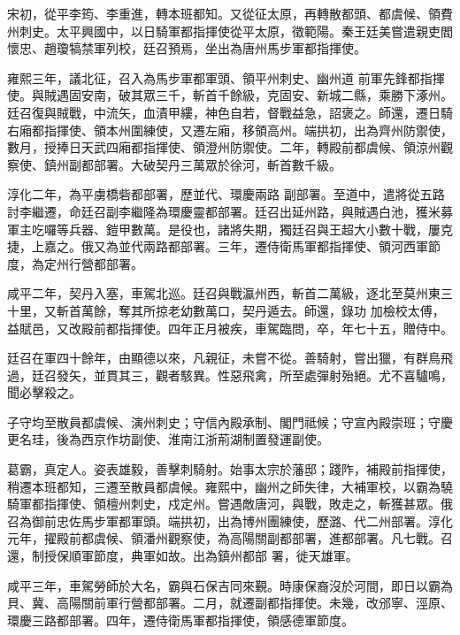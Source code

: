 \begin{pinyinscope}
 宋初，從平李筠、李重進，轉本班都知。又從征太原，再轉散都頭、都虞候、領費州刺史。太平興國中，以日騎軍都指揮使從平太原，徵範陽。秦王廷美嘗遣親吏閻懷忠、趙瓊犒禁軍列校，廷召預焉，坐出為唐州馬步軍都指揮使。



 雍熙三年，議北征，召入為馬步軍都軍頭、領平州刺史、幽州道
 前軍先鋒都指揮使。與賊遇固安南，破其眾三千，斬首千餘級，克固安、新城二縣，乘勝下涿州。廷召復與賊戰，中流矢，血漬甲縷，神色自若，督戰益急，詔褒之。師還，遷日騎右廂都指揮使、領本州圍練使，又遷左廂，移領高州。端拱初，出為齊州防禦使，數月，授捧日天武四廂都指揮使、領澄州防禦使。二年，轉殿前都虞候、領涼州觀察使、鎮州副都部署。大破契丹三萬眾於徐河，斬首數千級。



 淳化二年，為平虜橋砦都部署，歷並代、環慶兩路
 副部署。至道中，遣將從五路討李繼遷，命廷召副李繼隆為環慶靈都部署。廷召出延州路，與賊遇白池，獲米募軍主吃囉等兵器、鎧甲數萬。是役也，諸將失期，獨廷召與王超大小數十戰，屢克捷，上嘉之。俄又為並代兩路都部署。三年，遷侍衛馬軍都指揮使、領河西軍節度，為定州行營都部署。



 咸平二年，契丹入塞，車駕北巡。廷召與戰瀛州西，斬首二萬級，逐北至莫州東三十里，又斬首萬餘，奪其所掠老幼數萬口，契丹遁去。師還，錄功
 加檢校太傅，益賦邑，又改殿前都指揮使。四年正月被疾，車駕臨問，卒，年七十五，贈侍中。



 廷召在軍四十餘年，由顯德以來，凡親征，未嘗不從。善騎射，嘗出獵，有群鳥飛過，廷召發矢，並貫其三，觀者駭異。性惡飛禽，所至處彈射殆絕。尤不喜驢鳴，聞必擊殺之。



 子守均至散員都虞候、演州刺史；守信內殿承制、閣門祗候；守宣內殿崇班；守慶更名珪，後為西京作坊副使、淮南江浙荊湖制置發運副使。



 葛霸，真定人。姿表雄毅，善擊刺騎射。始事太宗於藩邸；踐阼，補殿前指揮使，稍遷本班都知，三遷至散員都虞候。雍熙中，幽州之師失律，大補軍校，以霸為驍騎軍都指揮使、領檀州刺史，戍定州。嘗遇敵唐河，與戰，敗走之，斬獲甚眾。俄召為御前忠佐馬步軍都軍頭。端拱初，出為博州團練使，歷潞、代二州部署。淳化元年，擢殿前都虞候、領潘州觀察使，為高陽關副都部署，進都部署。凡七戰。召還，制授保順軍節度，典軍如故。出為鎮州都部
 署，徙天雄軍。



 咸平三年，車駕勞師於大名，霸與石保吉同來覲。時康保裔沒於河間，即日以霸為貝、冀、高陽關前軍行營都部署。二月，就遷副都指揮使。未幾，改邠寧、涇原、環慶三路都部署。四年，遷侍衛馬軍都指揮使，領感德軍節度。




\end{pinyinscope}
